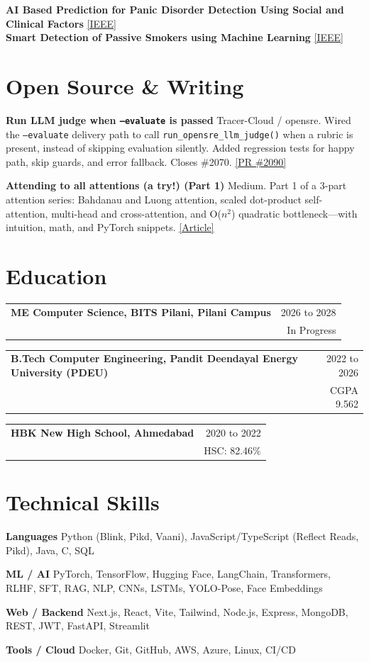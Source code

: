 \documentclass[10pt,letterpaper]{article}
\makeatletter
\newcommand{\resumeEduRow}[3]{%
  \begin{tabular*}{\textwidth}{@{}l@{\extracolsep{\fill}}r@{}}
    \textbf{#1} & \small #2 \\
    & \small #3 \\
  \end{tabular*}%
  \vspace{1pt}
}
\newcommand{\resumeSkillRow}[2]{\textbf{#1} #2\par\vspace{0pt}}
\makeatother
\begin{document}
\vspace{1pt}
\footnotesize
\textbf{AI Based Prediction for Panic Disorder Detection Using Social and Clinical Factors} \hfill \href{https://ieeexplore.ieee.org/document/11225866}{[IEEE]} \\
\textbf{Smart Detection of Passive Smokers using Machine Learning} \hfill \href{https://ieeexplore.ieee.org/document/10774944}{[IEEE]}

\section{Open Source \& Writing}
\footnotesize
\textbf{Run LLM judge when \texttt{--evaluate} is passed} \textendash{} Tracer-Cloud / opensre. Wired the \texttt{--evaluate} delivery path to call \texttt{run\_opensre\_llm\_judge()} when a rubric is present, instead of skipping evaluation silently. Added regression tests for happy path, skip guards, and error fallback. Closes \#2070. \href{https://github.com/Tracer-Cloud/opensre/pull/2090}{[PR \#2090]}

\textbf{Attending to all attentions (a try!) (Part 1)} \textendash{} Medium. Part 1 of a 3-part attention series: Bahdanau and Luong attention, scaled dot-product self-attention, multi-head and cross-attention, and O($n^2$) quadratic bottleneck---with intuition, math, and PyTorch snippets. \href{https://medium.com/@prathamsshah724/attending-to-all-attentions-a-try-part-1-a8df24c3f85a}{[Article]}

\section{Education}
\resumeEduRow{ME Computer Science, BITS Pilani, Pilani Campus}{2026 to 2028}{In Progress}
\resumeEduRow{B.Tech Computer Engineering, Pandit Deendayal Energy University (PDEU)}{2022 to 2026}{CGPA 9.562}
\resumeEduRow{HBK New High School, Ahmedabad}{2020 to 2022}{HSC: 82.46\%}

\section{Technical Skills}
\footnotesize
\resumeSkillRow{Languages}{Python (Blink, Pikd, Vaani), JavaScript/TypeScript (Reflect Reads, Pikd), Java, C, SQL}
\resumeSkillRow{ML / AI}{PyTorch, TensorFlow, Hugging Face, LangChain, Transformers, RLHF, SFT, RAG, NLP, CNNs, LSTMs, YOLO-Pose, Face Embeddings}
\resumeSkillRow{Web / Backend}{Next.js, React, Vite, Tailwind, Node.js, Express, MongoDB, REST, JWT, FastAPI, Streamlit}
\resumeSkillRow{Tools / Cloud}{Docker, Git, GitHub, AWS, Azure, Linux, CI/CD}
\end{document}
